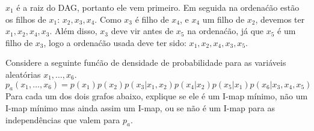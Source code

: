 \begin{exenumerate}
\begin{center}
\end{center}

\begin{solution}
    $x_1$ \'e a raiz do DAG, portanto ele vem primeiro. Em seguida na ordena\'c\~ao est\~ao os filhos de $x_1$: $x_2, x_3, x_4$. Como $x_3$ \'e filho de $x_4$, e $x_4$ um filho de $x_2$, devemos ter $x_1, x_2, x_4, x_3$. Al\'em disso, $x_3$ deve vir antes de $x_5$ na ordena\'c\~ao, j\'a que $x_5$ \'e um filho de $x_3$, logo a ordena\'c\~ao usada deve ter sido: $x_1, x_2, x_4, x_3, x_5$.
    
\end{solution}

\end{exenumerate}


Considere a seguinte fun\'c\~ao de densidade de probabilidade para as vari\'aveis aleat\'orias $x_1, \ldots, x_6$.
$$ p_a(x_1, \ldots, x_6) = p(x_1) p(x_2) p(x_3 | x_1,x_2) p(x_4 | x_2)
p(x_5| x_1) p(x_6 | x_3, x_4, x_5)$$ Para cada um dos dois grafos abaixo, explique se ele \'e um I-map m\'inimo, n\~ao um I-map m\'inimo mas ainda assim um I-map, ou se n\~ao \'e um I-map para as independ\^encias que valem para $p_a$.

